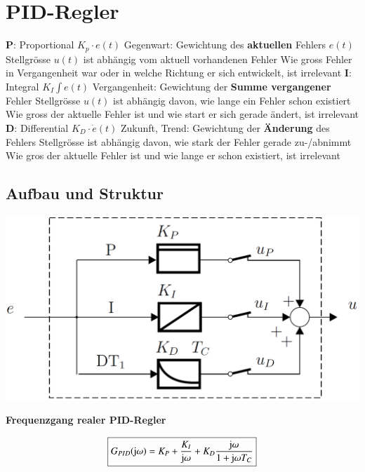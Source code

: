\section{PID-Regler}

\begin{outline}
    \1 \textbf{P}: Proportional $K_p \cdot e(t)$
        \2 Gegenwart: Gewichtung des \textbf{aktuellen} Fehlers $e(t)$
            \3 Stellgrösse $u(t)$ ist abhängig vom aktuell vorhandenen Fehler
            \3 Wie gross Fehler in Vergangenheit war oder in welche Richtung er sich entwickelt, ist irrelevant
    \1 \textbf{I}: Integral $K_I \int e(t)$
        \2 Vergangenheit: Gewichtung der \textbf{Summe vergangener} Fehler
            \3  Stellgrösse $u(t)$ ist abhängig davon, wie lange ein Fehler schon existiert
            \3 Wie gross der aktuelle Fehler ist und wie start er sich gerade ändert, ist irrelevant
    \1 \textbf{D}: Differential $K_D \cdot \dot{e}(t)$
        \2 Zukunft, Trend: Gewichtung der \textbf{Änderung} des Fehlers
            \3 Stellgrösse ist abhängig davon, wie stark der Fehler gerade zu-/abnimmt
            \3 Wie gros der aktuelle Fehler ist und wie lange er schon existiert, ist irrelevant
\end{outline}


\subsection{Aufbau und Struktur}

\begin{minipage}{0.48\columnwidth}
    \includegraphics[width=\columnwidth]{images/pid_regler_aufbau.png}
\end{minipage}
\hfill
\begin{minipage}{0.48\columnwidth}
    \begin{center}
        \textbf{Frequenzgang realer PID-Regler}
    \end{center}
    $$ \boxed{ G_{PID}(\mathrm{j} \omega) = K_P + \frac{K_I}{\mathrm{j} \omega} + K_D \frac{\mathrm{j} \omega}{1 + \mathrm{j} \omega T_C} } $$
\end{minipage}